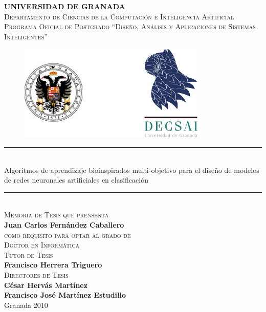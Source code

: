 \thispagestyle{empty}
	\begin{center}
		{\huge\scshape\rmfamily\bf UNIVERSIDAD DE GRANADA} \\[0.5cm]
		{\large\scshape Departamento de Ciencias de la Computación e
		Inteligencia Artificial} \\[0.25cm]
		{\large \scshape Programa Oficial de Postgrado ``Diseño, Análisis y
		Aplicaciones de Sistemas Inteligentes''}
		\vspace{-0.22cm}
	\end{center}
	\begin{figure}[h!]
	\centering
	\includegraphics[keepaspectratio,width=9cm]{./figuras/ugrdecsai.jpg}
	\end{figure}
	\vspace{-0.35cm}
	\begin{center}
		\rule{\textwidth}{0.03cm} \\[0.3cm]
		{\huge \sffamily Algoritmos de aprendizaje bioinspirados multi-objetivo para el
		diseño de modelos	de	redes neuronales artificiales en clasificación} \\
		\rule{\textwidth}{0.03cm} \\[0.3cm]
		{\large\scshape Memoria de Tesis que prensenta} \\[0.2cm]
		{\large \textbf{Juan Carlos Fernández Caballero}} \\[0.2cm]
		{\large\scshape como requisito para optar al grado de \\ Doctor en Informática}
\\[0.8cm]
		{\large\scshape Tutor de Tesis} \\[0.1cm]
		{\large \textbf{Francisco Herrera Triguero}} \\[0.3cm]
		{\large\scshape Directores de Tesis} \\[0.1cm]
		{\large \textbf{César Hervás Martínez}} \\
      {\large \textbf{Francisco José Martínez Estudillo}} \\[0.5cm]
		{Granada \hspace{7cm} 2010}
	\end{center}

